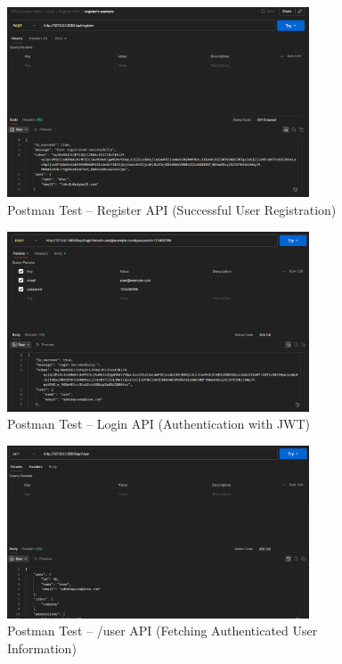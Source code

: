 \begin{figure}[H]
    \centering
    \includegraphics[width=0.8\textwidth]{chapters/chapter 3/figures/register.png}
    \caption{Postman Test -- Register API (Successful User Registration)}
    \label{fig:postman_register}
\end{figure}

\begin{figure}[H]
    \centering
    \includegraphics[width=0.8\textwidth]{chapters/chapter 3/figures/login.png}
    \caption{Postman Test -- Login API (Authentication with JWT)}
    \label{fig:postman_login}
\end{figure}

\begin{figure}[H]
    \centering
    \includegraphics[width=0.8\textwidth]{chapters/chapter 3/figures/user.png}
    \caption{Postman Test -- /user API (Fetching Authenticated User Information)}
    \label{fig:postman_user}
\end{figure}

